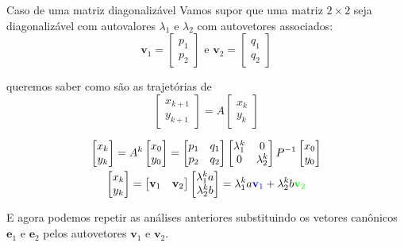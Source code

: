 \documentclass{beamer}
\begin{document}
\begin{frame}{Caso de uma matriz diagonalizável}
  Vamos supor que uma matriz $2 \times 2$ seja diagonalizável com autovalores $\lambda_1$ e
  $\lambda_2$ com autovetores associados:
  $$ \mathbf{v}_1 = \begin{bmatrix}
    p_1 \\ p_2
  \end{bmatrix} \text{ e } \mathbf{v}_2=\begin{bmatrix}
    q_1 \\ q_2
  \end{bmatrix}$$

  queremos saber como são as trajetórias de 
  $$ \begin{bmatrix}
    x_{k+1} \\ y_{k+1}\end{bmatrix} = A \begin{bmatrix}
      x_k \\ y_k
  \end{bmatrix}$$
  
\end{frame}


\begin{frame}
  \begin{gather*}
    \begin{bmatrix}
      x_k \\ y_k
    \end{bmatrix} = A^k \begin{bmatrix}
      x_0 \\ y_0
    \end{bmatrix} = \begin{bmatrix}
      p_1 & q_1 \\
      p_2 & q_2 
    \end{bmatrix}\begin{bmatrix}
      \lambda_1^k & 0 \\
      0 & \lambda_2^k
    \end{bmatrix} P^{-1}\begin{bmatrix}
      x_0 \\ y_0
    \end{bmatrix} \\
    \begin{bmatrix}
      x_k \\ y_k
    \end{bmatrix} =\begin{bmatrix}
      \mathbf{v}_1 & \mathbf{v}_2
    \end{bmatrix} \begin{bmatrix}
      \lambda_1^k a \\ \lambda_2^k b
    \end{bmatrix} = \lambda_1^k a\textcolor{blue}{\mathbf{v}_1} + \lambda_2^kb \textcolor{green}{\mathbf{v}_2}
  \end{gather*}

  E agora podemos repetir as análises anteriores  substituindo os
  vetores canônicos $\mathbf{e}_1$ e $\mathbf{e}_2$ pelos autovetores
  $\mathbf{v}_1$ e $\mathbf{v}_2$.
\end{frame}
\end{document}
